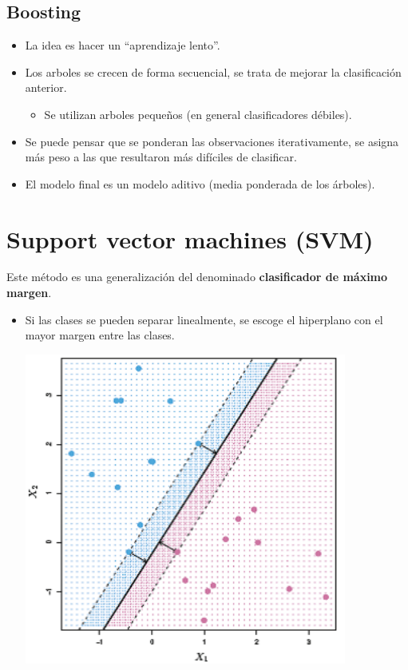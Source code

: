 \documentclass[]{book}
\providecommand{\tightlist}{%
  \setlength{\itemsep}{0pt}\setlength{\parskip}{0pt}}
\begin{document}
\subsection{Boosting}\label{boosting}

\begin{itemize}
\item
  La idea es hacer un ``aprendizaje lento''.
\item
  Los arboles se crecen de forma secuencial, se trata de mejorar la
  clasificación anterior.

  \begin{itemize}
  \tightlist
  \item
    Se utilizan arboles pequeños (en general clasificadores débiles).
  \end{itemize}
\item
  Se puede pensar que se ponderan las observaciones iterativamente, se
  asigna más peso a las que resultaron más difíciles de clasificar.
\item
  El modelo final es un modelo aditivo (media ponderada de los árboles).
\end{itemize}

\section{Support vector machines
(SVM)}\label{support-vector-machines-svm}

Este método es una generalización del denominado \textbf{clasificador de
máximo margen}.

\begin{itemize}
\item
  Si las clases se pueden separar linealmente, se escoge el hiperplano
  con el mayor margen entre las clases.

  \includegraphics[width=4.17in]{images/svm1}
\end{itemize}
\end{document}

